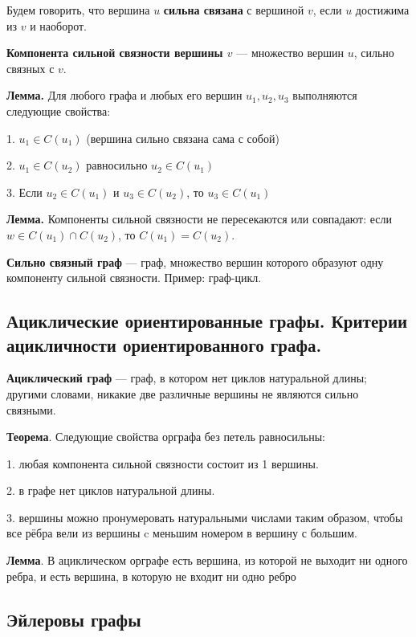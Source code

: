 \documentclass[a4paper, 10pt]{article}
\begin{document}
Будем говорить, что вершина $u$ \textbf{сильна связана} с вершиной $v$, если $u$ достижима из $v$ и наоборот.

\textbf{Компонента сильной связности вершины $v$} --- множество вершин $u$, сильно связных с $v$.

\textbf{Лемма.} Для любого графа и любых его вершин $u_1, u_2, u_3$ выполняются следующие свойства:

1. $u_1 \in C(u_1)$ (вершина сильно связана сама с собой)

2. $u_1 \in C(u_2)$ равносильно $u_2 \in C(u_1)$

3. Если $u_2 \in C(u_1)$ и $u_3 \in C(u_2)$, то $u_3 \in C(u_1)$


\textbf{Лемма.} Компоненты сильной связности не пересекаются или совпадают: если $w \in C(u_1) \cap C(u_2)$, то $C(u_1) = C(u_2)$.

\textbf{Сильно связный граф} --- граф, множество вершин которого образуют одну компоненту сильной связности. Пример: граф-цикл.

\subsection{Ациклические ориентированные графы. Критерии ацикличности ориентированного графа.}

\textbf{Ациклический граф} --- граф, в котором нет циклов натуральной длины; другими словами, никакие две различные вершины не являются сильно связными.

\vspace{2mm}

\textbf{Теорема}. Следующие свойства орграфа без петель равносильны:

1. любая компонента сильной связности состоит из 1 вершины.

2. в графе нет циклов натуральной длины.

3. вершины можно пронумеровать натуральными числами таким образом, чтобы все рёбра вели из вершины c меньшим номером в вершину с большим.

\vspace{2mm}

\textbf{Лемма}. В ациклическом орграфе есть вершина, из которой не выходит ни одного ребра, и есть вершина, в которую не входит ни одно ребро


\subsection{Эйлеровы графы}
\end{document}
